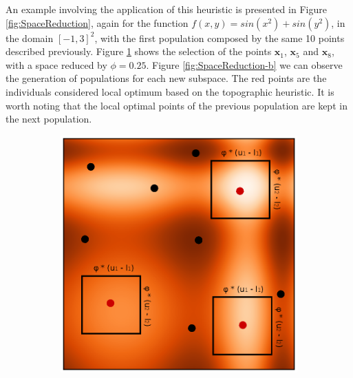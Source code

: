 An example involving the application of this heuristic is presented in Figure \ref{fig:SpaceReduction}, again for the function $f(x, y) = sin(x^2) + sin(y^2)$, in the domain $[-1, 3]^2$, with the first population composed by the same 10 points described previously. Figure \ref{fig:SpaceReduction-a} shows the selection of the points $\bm{x}_1$, $\bm{x}_5$ and $\bm{x}_8$, with a space reduced by $\phi = 0.25$. Figure \ref{fig:SpaceReduction-b} we can observe the generation of populations for each new subspace. The red points are the individuals considered local optimum based on the topographic heuristic. It is worth noting that the local optimal points of the previous population are kept in the next population.


\begin{figure}[tp]
\centering
\begin{subfigure}{.5\textwidth}
  \centering
  \includegraphics[width=1.1\linewidth]{img/Topo/fig_2.eps}
  \caption{}
  \label{fig:SpaceReduction-a}
\end{subfigure}%
\begin{subfigure}{.5\textwidth}
  \centering

\end{subfigure}
\end{figure}

